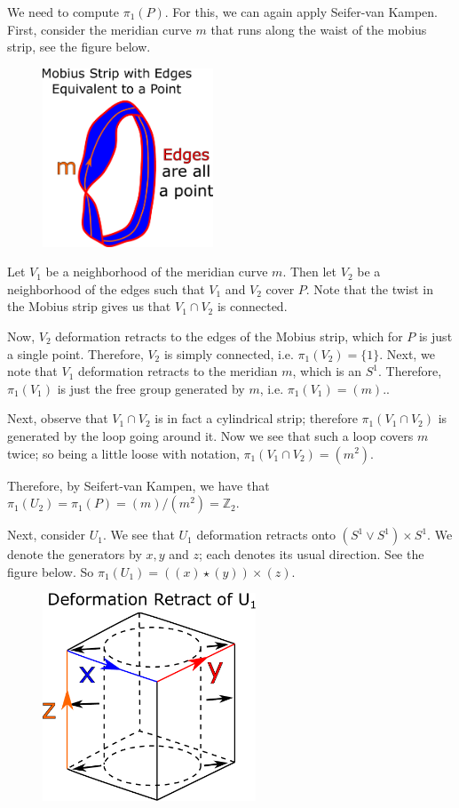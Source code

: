 We need to compute \(\pi_1(P)\). For this, we can again apply Seifer-van Kampen. First, consider the meridian 
curve \(m\) that runs along the waist of the 
mobius strip, see the figure below. 

\begin{figure}[h]
\centering
\includegraphics[width=2in]{Topology/FundamentalGroupQuotient/mobius.pdf}
\end{figure}
Let \(V_1\) be a neighborhood of
the meridian curve \(m\). Then let \(V_2\) be a neighborhood of 
the edges such that \(V_1\) and \(V_2\) cover \(P\). Note that the twist in the Mobius strip gives us that
\(V_1 \cap V_2\) is connected.

Now, \(V_2\) deformation retracts to the edges of the Mobius strip, which for \(P\) is just a single point.
Therefore, \(V_2\) is simply connected, i.e. \(\pi_1(V_2) = \{1\}\). Next, we note that \(V_1\) deformation
retracts to the meridian \(m\), which is an \(S^1\). Therefore, \(\pi_1(V_1)\) is just the free group 
generated by \(m\), i.e. \(\pi_1(V_1) = (m)\)..

Next, observe that \(V_1 \cap V_2\) is in fact a cylindrical strip; therefore \(\pi_1(V_1 \cap V_2)\) is generated
by the loop going around it. Now we see that such a loop covers \(m\) twice; so being a little loose with
notation, \(\pi_1(V_1 \cap V_2) = (m^2)\).

Therefore, by Seifert-van Kampen, we have that \(\pi_1(U_2) = \pi_1(P) = (m) / (m^2) = \mathbb Z_2\).

Next, consider \(U_1\). We see that \(U_1\) deformation retracts onto \((S^1 \vee S^1) \times S^1\). We
denote the generators by \(x, y\) and \(z\); each denotes its usual direction. See the figure below.
So \(\pi_1(U_1) = ((x) \star (y))\times (z)\).

\begin{figure}[h]
\centering
\includegraphics[width = 2.5in]{Topology/FundamentalGroupQuotient/deformationRetract2.pdf}
\end{figure} 


